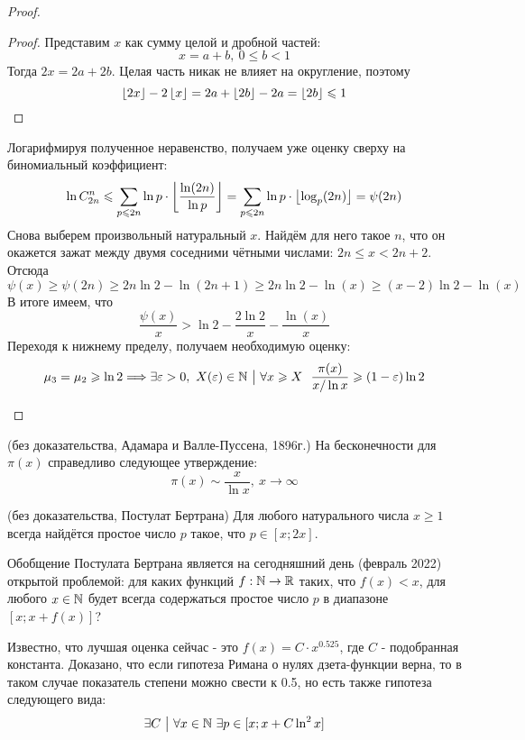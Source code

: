 \begin{proof}
\begin{itemize}
		\begin{proof}
			Представим $x$ как сумму целой и дробной частей:
			\[
				x = a + b,\ 0 \le b < 1
			\]
			Тогда $2x = 2a + 2b$. Целая часть никак не влияет на округление, поэтому
			\[
				\left\lfloor 2x \right\rfloor - 2\left\lfloor x \right\rfloor = 2a + \left\lfloor 2b \right\rfloor - 2a = \left\lfloor 2b \right\rfloor \leqslant 1
			\]
		\end{proof}
	
		Логарифмируя полученное неравенство, получаем уже оценку сверху на биномиальный коэффициент:
		\[
			\ln C_{2n}^n \leqslant \sum\limits_{p \leqslant 2n} \ln p \cdot \left\lfloor \frac{\ln (2n)}{\ln p} \right\rfloor = \sum\limits_{p \leqslant 2n} \ln p \cdot \left\lfloor \log_p (2n) \right\rfloor = \psi(2n)
		\]
		Снова выберем произвольный натуральный $x$. Найдём для него такое $n$, что он окажется зажат между двумя соседними чётными числами: $2n \le x < 2n + 2$. Отсюда
		\[
			\psi(x) \ge \psi(2n) \ge 2n\ln 2 - \ln (2n + 1) \ge 2n\ln 2 - \ln(x) \ge (x - 2)\ln 2 - \ln (x)
		\]
		В итоге имеем, что
		\[
			\frac{\psi(x)}{x} > \ln 2 - \frac{2\ln 2}{x} - \frac{\ln(x)}{x}
		\]
		Переходя к нижнему пределу, получаем необходимую оценку:
		\[
			\mu_3 = \mu_2 \geqslant \ln 2 \Longrightarrow \exists \varepsilon > 0,\ X(\varepsilon) \in \mathbb{N} \ \big|\  \forall x \geqslant X\ \ \frac{\pi(x)}{x / \ln x} \geqslant (1 - \varepsilon)\ln 2
		\]
	\end{itemize}
\end{proof}

\begin{theorem} (без доказательства, Адамара и Валле-Пуссена, 1896г.)
	На бесконечности для $\pi(x)$ справедливо следующее утверждение:
	\[
	\pi(x) \sim \frac{x}{\ln x},\ x \to \infty
	\]
\end{theorem}

\begin{theorem} (без доказательства, Постулат Бертрана)
	Для любого натурального числа $x \ge 1$ всегда найдётся простое число $p$ такое, что $p \in [x; 2x]$.
\end{theorem}

\begin{note}
	Обобщение Постулата Бертрана является на сегодняшний день (февраль 2022) открытой проблемой: для каких функций $f: \mathbb{N} \to \mathbb{R}$ таких, что $f(x) < x$, для любого $x \in \mathbb{N}$ будет всегда содержаться простое число $p$ в диапазоне $[x; x + f(x)]$?
	
	Известно, что лучшая оценка сейчас - это $f(x) = C \cdot x^{0.525}$, где $C$ - подобранная константа. Доказано, что если гипотеза Римана о нулях дзета-функции верна, то в таком случае показатель степени можно свести к 0.5, но есть также гипотеза следующего вида:
	\[
		\exists C \ \big|\  \forall x \in \mathbb{N}\ \exists p \in [x; x + C\ln^2 x]
	\]
\end{note}